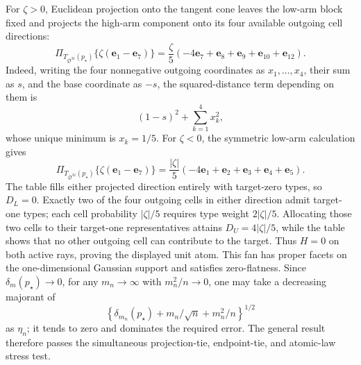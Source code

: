 For \(\zeta>0\), Euclidean projection onto the tangent cone leaves the low-arm block fixed and projects the high-arm component onto its four available outgoing cell directions:
\[
\Pi_{T_{\mathfrak O^{32}}(p_\star)}
\{\zeta(\mathbf e_1-\mathbf e_7)\}
=\frac{\zeta}{5}(-4\mathbf e_7+\mathbf e_8+\mathbf e_9+\mathbf e_{10}+\mathbf e_{12}).
\]
Indeed, writing the four nonnegative outgoing coordinates as \(x_1,\ldots,x_4\), their sum as \(s\), and the base coordinate as \(-s\), the squared-distance term depending on them is
\[
(1-s)^2+\sum_{k=1}^4x_k^2,
\]
whose unique minimum is \(x_k=1/5\).  For \(\zeta<0\), the symmetric low-arm calculation gives
\[
\Pi_{T_{\mathfrak O^{32}}(p_\star)}
\{\zeta(\mathbf e_1-\mathbf e_7)\}
=\frac{|\zeta|}{5}(-4\mathbf e_1+\mathbf e_2+\mathbf e_3+\mathbf e_4+\mathbf e_5).
\]
The table fills either projected direction entirely with target-zero types, so \(D_L=0\).  Exactly two of the four outgoing cells in either direction admit target-one types; each cell probability \(|\zeta|/5\) requires type weight \(2|\zeta|/5\).  Allocating those two cells to their target-one representatives attains \(D_U=4|\zeta|/5\), while the table shows that no other outgoing cell can contribute to the target.  Thus \(H=0\) on both active rays, proving the displayed unit atom.  This fan has proper facets on the one-dimensional Gaussian support and satisfies zero-flatness.  Since \(\delta_m(p_\star)\to0\), for any \(m_n\to\infty\) with \(m_n^2/n\to0\), one may take a decreasing majorant of
\[
\left\{\delta_{m_n}(p_\star)+m_n/\sqrt n+m_n^2/n\right\}^{1/2}
\]
as \(\eta_n\); it tends to zero and dominates the required error.  The general result therefore passes the simultaneous projection-tie, endpoint-tie, and atomic-law stress test.